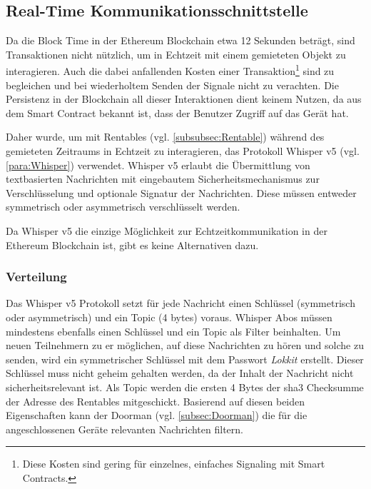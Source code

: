 \subsection{Real-Time Kommunikationsschnittstelle}
\label{subsec:Real_Time_Kommunikationsschnittstelle}
Da die Block Time in der Ethereum Blockchain etwa 12 Sekunden beträgt, sind Transaktionen nicht nützlich, um in Echtzeit mit einem gemieteten Objekt zu interagieren. Auch die dabei anfallenden Kosten einer Transaktion\footnote{Diese Kosten sind gering für einzelnes, einfaches Signaling mit Smart Contracts.} sind zu begleichen und bei wiederholtem Senden der Signale nicht zu verachten. Die Persistenz in der Blockchain all dieser Interaktionen dient keinem Nutzen, da aus dem Smart Contract bekannt ist, dass der Benutzer Zugriff auf das Gerät hat. \cite{blog.ethereum.org/block-time}

Daher wurde, um mit Rentables (vgl. \ref{subsubsec:Rentable}) während des gemieteten Zeitraums in Echtzeit zu interagieren, das Protokoll Whisper v5 (vgl. \ref{para:Whisper}) verwendet. Whisper v5 erlaubt die Übermittlung von textbasierten Nachrichten mit eingebautem Sicherheitsmechanismus zur Verschlüsselung und optionale Signatur der Nachrichten. Diese müssen entweder symmetrisch oder asymmetrisch verschlüsselt werden.\cite[Wiki/Whisper Usage]{go-ethereum}

Da Whisper v5 die einzige Möglichkeit zur Echtzeitkommunikation in der Ethereum Blockchain ist, gibt es keine Alternativen dazu.

\subsubsection{Verteilung}
\label{subsubsec:Verteilung}
Das Whisper v5 Protokoll setzt für jede Nachricht einen Schlüssel (symmetrisch oder asymmetrisch) und ein Topic (4 bytes) voraus. Whisper Abos müssen mindestens ebenfalls einen Schlüssel und ein Topic als Filter beinhalten. Um neuen Teilnehmern zu er möglichen, auf diese Nachrichten zu hören und solche zu senden, wird ein symmetrischer Schlüssel mit dem Passwort \emph{Lokkit} erstellt. Dieser Schlüssel muss nicht geheim gehalten werden, da der Inhalt der Nachricht nicht sicherheitsrelevant ist. Als Topic werden die ersten 4 Bytes der sha3 Checksumme der Adresse des Rentables mitgeschickt. Basierend auf diesen beiden Eigenschaften kann der Doorman (vgl. \ref{subsec:Doorman}) die für die angeschlossenen Geräte relevanten Nachrichten filtern.\cite[Wiki/Whisper Overview]{go-ethereum}

